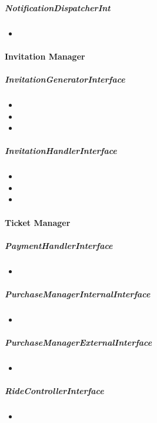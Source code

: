 		\subparagraph{NotificationDispatcherInt}
			\begin{itemize}
				\item {}
			\end{itemize}

	\paragraph{Invitation Manager}
		\subparagraph{InvitationGeneratorInterface}
			\begin{itemize}
				\item {}
				\item {}
				\item {}
			\end{itemize}

		\subparagraph{InvitationHandlerInterface}
			\begin{itemize}
				\item {}
				\item {}
				\item {}
			\end{itemize}

	\paragraph{Ticket Manager}
		\subparagraph{PaymentHandlerInterface}
			\begin{itemize}
				\item {}
			\end{itemize}
		\subparagraph{PurchaseManagerInternalInterface}
			\begin{itemize}
				\item {}
			\end{itemize}
		\subparagraph{PurchaseManagerExternalInterface}
			\begin{itemize}
				\item {}
			\end{itemize}
		\subparagraph{RideControllerInterface}
			\begin{itemize}
				\item {}
			\end{itemize}
